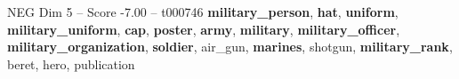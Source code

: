 \begin{textsample}{NEG Dim 5 – Score -7.00 – t000746}  \label{ex:f5_neg_009}
\textbf{military\_person}, \textbf{hat}, \textbf{uniform}, \textbf{military\_uniform}, \textbf{cap}, \textbf{poster}, \textbf{army}, \textbf{military}, \textbf{military\_officer}, \textbf{military\_organization}, \textbf{soldier}, air\_gun, \textbf{marines}, shotgun, \textbf{military\_rank}, beret, hero, publication

\end{textsample}
